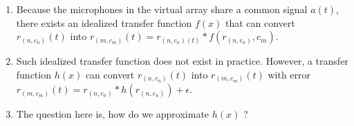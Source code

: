 \documentclass[14pt]{extarticle}
\begin{document}
\begin{enumerate}
\item Because the microphones in the virtual array share a common signal $a(t)$, there exists an idealized transfer function $f(x)$ that can convert $r_{(n,c_n)}(t)$ into $r_{(m,c_m)}(t) = r_{(n,c_n)(t)} \ast f(r_{(n,c_n)},c_m)$. 

\item Such idealized transfer function does not exist in practice. However, a transfer function $h(x)$ can convert $r_{(n,c_n)}(t)$ into $r_{(m,c_m)}(t)$ with error $r_{(m,c_m)}(t) = r_{(n,c_n)} \ast h(r_{(n,c_n)}) + \epsilon$.

\item The question here is, how do we approximate $h(x)$ ?


\end{enumerate}




\end{document}
